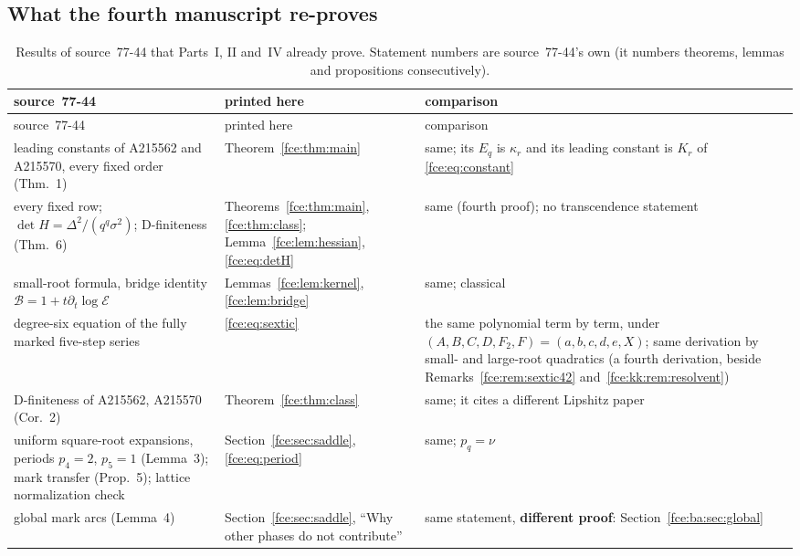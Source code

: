 \documentclass[11pt,a4paper]{article}
\numberwithin{equation}{section}
\theoremstyle{definition}\newtheorem{definition}[theorem]{Definition}
\theoremstyle{remark}\newtheorem{remark}[theorem]{Remark}
\newcommand{\E}{\mathcal E}
\begin{document}
\subsection{What the fourth manuscript re-proves}\label{fce:ba:sec:overlap}
{\small
\begin{longtable}{@{}>{\raggedright\arraybackslash}p{}>{\raggedright\arraybackslash}p{}>{\raggedright\arraybackslash}p{}@{}}
\caption{Results of source~77-44 that Parts~I, II and~IV already prove.
Statement numbers are source~77-44's own (it numbers theorems, lemmas and
propositions consecutively).}\label{fce:ba:tab:overlap}\\
\toprule
source~77-44 & printed here & comparison\\
\midrule
\endfirsthead
\toprule
source~77-44 & printed here & comparison\\
\midrule
\endhead
\bottomrule
\endfoot
leading constants of A215562 and A215570, every fixed order (Thm.~1) &
 Theorem~\ref{fce:thm:main} & same; its $E_q$ is $\kappa_r$ and its leading
 constant is $K_r$ of \eqref{fce:eq:constant}\\
every fixed row; $\det H=\Delta^2/(q^q\sigma^2)$; D-finiteness (Thm.~6) &
 Theorems~\ref{fce:thm:main}, \ref{fce:thm:class}; Lemma~\ref{fce:lem:hessian},
 \eqref{fce:eq:detH} & same (fourth proof); no transcendence statement\\
small-root formula, bridge identity $\mathcal B=1+t\partial_t\log\E$ &
 Lemmas~\ref{fce:lem:kernel}, \ref{fce:lem:bridge} & same; classical
 \cite{bf}\\
degree-six equation of the fully marked five-step series &
 \eqref{fce:eq:sextic} & the same polynomial term by term, under
 $(A,B,C,D,F_2,F)=(a,b,c,d,e,X)$; same derivation by small- and large-root
 quadratics (a fourth derivation, beside Remarks~\ref{fce:rem:sextic42}
 and~\ref{fce:kk:rem:resolvent})\\
D-finiteness of A215562, A215570 (Cor.~2) & Theorem~\ref{fce:thm:class}
 & same; it cites a different Lipshitz paper \cite{lipshitz89}\\
uniform square-root expansions, periods $p_4=2$, $p_5=1$ (Lemma~3); mark
 transfer (Prop.~5); lattice normalization check &
 Section~\ref{fce:sec:saddle}, \eqref{fce:eq:period} & same; $p_q=\nu$\\
global mark arcs (Lemma~4) & Section~\ref{fce:sec:saddle}, ``Why other
 phases do not contribute'' & same statement, \textbf{different proof}:
 Section~\ref{fce:ba:sec:global}\\

\end{longtable}}
\end{document}
